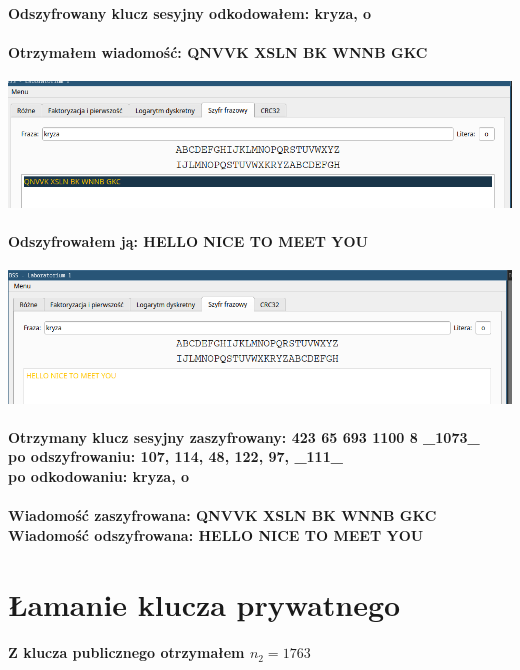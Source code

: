 \documentclass{article}[12pt]
\begin{document}
\paragraph{Odszyfrowany klucz sesyjny odkodowałem: kryza, o}
\paragraph{Otrzymałem wiadomość: QNVVK XSLN BK WNNB GKC \\ } 
\includegraphics[width=1\textwidth]{eight.png} 
\paragraph{Odszyfrowałem ją: HELLO NICE TO MEET YOU \\}
\includegraphics[width=1\textwidth]{nine.png}
\paragraph{Otrzymany klucz sesyjny zaszyfrowany: 423 65 693 1100 8 \_1073\_ \\ po odszyfrowaniu: 107, 114, 48, 122, 97, \_111\_ \\ po odkodowaniu: kryza, o }
\paragraph{Wiadomość zaszyfrowana: QNVVK XSLN BK WNNB GKC \\ Wiadomość odszyfrowana: HELLO NICE TO MEET YOU}
\section{Łamanie klucza prywatnego}
\paragraph{Z klucza publicznego otrzymałem $n_2 = 1763$}
\end{document}
